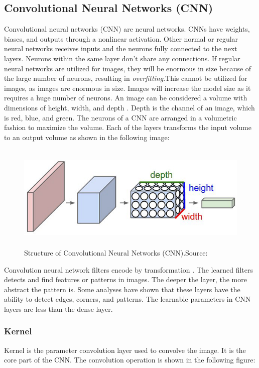 \subsection{Convolutional Neural Networks (CNN)}
Convolutional neural networks (CNN) are neural networks. CNNs have weights, biases, and outputs through a nonlinear activation.
Other normal or regular neural networks receives inputs and the neurons fully connected to the next layers.
Neurons within the same layer don't share any connections. If regular neural
networks are utilized for images, they will be enormous in size because of the large number of neurons,
resulting in \textit{overfitting}.This cannot be utilized for images, as images are enormous in size. Images will increase
the model size as it requires a huge number of neurons. An image can be considered a
volume with dimensions of height, width, and depth \cite{bib:dlforcv}. Depth is the channel of an image,
which is red, blue, and green. The neurons of a CNN are arranged in a volumetric fashion
to maximize the volume. Each of the layers transforms the input volume to an
output volume as shown in the following image:
\begin{figure}[H]
	\centering
	\includegraphics[height=2in]{images/cnn.png}
	\caption{Structure of Convolutional Neural Networks (CNN).Source:\cite{bib:dlforcv}}
	\label{fig:cnn}
\end{figure}

Convolution neural network filters encode by transformation \cite{bib:dlforcv}. The learned filters detects and find 
features or patterns in images. The deeper the layer, the more abstract the pattern is. Some
analyses have shown that these layers have the ability to detect edges, corners, and
patterns. The learnable parameters in CNN layers are less than the dense layer.
\subsubsection{Kernel}
Kernel is the parameter convolution layer used to convolve the image. It is the core part of the CNN. The convolution
operation is shown in the following figure:

